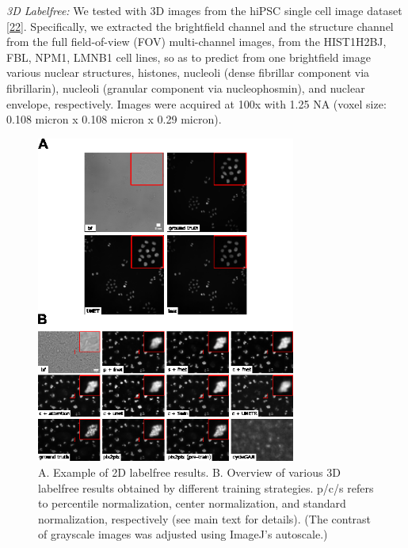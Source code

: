 \emph{3D Labelfree:} We tested with 3D images from the hiPSC single cell image dataset {[}\protect\hyperlink{ref-5sGcmDuy}{22}{]}. Specifically, we extracted the brightfield channel and the structure channel from the full field-of-view (FOV) multi-channel images, from the HIST1H2BJ, FBL, NPM1, LMNB1 cell lines, so as to predict from one brightfield image various nuclear structures, histones, nucleoli (dense fibrillar component via fibrillarin), nucleoli (granular component via nucleophosmin), and nuclear envelope, respectively. Images were acquired at 100x with 1.25 NA (voxel size: 0.108 micron x 0.108 micron x 0.29 micron).

\begin{figure}
\hypertarget{fig:labelfree_comparison}{%
\centering
\includegraphics[width=0.76\textwidth,height=0.9\textheight]{images/labelfree_comparison_justin.png}
\caption{A. Example of 2D labelfree results. B. Overview of various 3D labelfree results obtained by different training strategies. p/c/s refers to percentile normalization, center normalization, and standard normalization, respectively (see main text for details). (The contrast of grayscale images was adjusted using ImageJ's autoscale.)}\label{fig:labelfree_comparison}
}
\end{figure}

